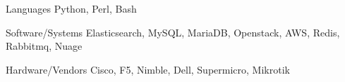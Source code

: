 
\begin{cvskills}

  \cvskill
    {Languages} %
    {Python, Perl, Bash} %

  \cvskill
    {Software/Systems} %
    {Elasticsearch, MySQL, MariaDB, Openstack, AWS, Redis, Rabbitmq, Nuage} %

  \cvskill
    {Hardware/Vendors} %
    {Cisco, F5, Nimble, Dell, Supermicro, Mikrotik} %

\end{cvskills}

